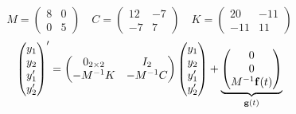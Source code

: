\documentclass[11pt,letterpaper]{article}
\newenvironment{answerarea}{%
  \par\noindent\begin{lrbox}{\AnswerAreaBox}\begin{minipage}{\dimexpr\linewidth-2\fboxsep-2\fboxrule\relax}%
  \setlength{\abovedisplayskip}{4pt}\setlength{\belowdisplayskip}{4pt}%
  \setlength{\abovedisplayshortskip}{4pt}\setlength{\belowdisplayshortskip}{4pt}%
}{%
  \end{minipage}\end{lrbox}\fbox{\usebox{\AnswerAreaBox}}\par
}
\begin{document}
\begin{enumerate}
\noindent{}
\begin{answerarea}
\[
M=\begin{pmatrix}8&0\\0&5\end{pmatrix}
\quad
C=\begin{pmatrix}12&-7\\-7&7\end{pmatrix}
\quad
K=\begin{pmatrix}20&-11\\-11&11\end{pmatrix}
\]
\[
\begin{pmatrix}y_1\\y_2\\y_1'\\y_2'\end{pmatrix}'=
\begin{pmatrix}
0_{2\times2}&I_2\\
-M^{-1}K&-M^{-1}C
\end{pmatrix}
\begin{pmatrix}y_1\\y_2\\y_1'\\y_2'\end{pmatrix}
+\underbrace{\begin{pmatrix}0\\0\\M^{-1}\mathbf{f}(t)\end{pmatrix}}_{\mathbf{g}(t)}
\]
\end{answerarea}


\end{enumerate}
\end{document}

